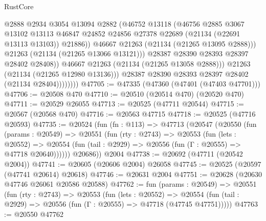 \begin{lexlean}{RustCore}
\begin{coremodule}
                              @2888
                              @2934
                              @3054
                              @13094
                              @2882
                              (@46752
                                @13118
                                (@46756
                                  @2885
                                  @3067
                                  @13102
                                  @13113
                                  @46847
                                  @24852
                                  @24856
                                  @27378
                                  @22689
                                  (@21134 (@22691 @13113 @13103))
                                  @21886))
                              @46667
                              @21263
                              (@21134 (@21265 @13095 @2888)))
                            @21263
                            (@21134 (@21265 @13066 @13121)))
                          @28387
                          @28390
                          @28393
                          @28397
                          @28402
                          @28408))
                      @46667
                      @21263
                      (@21134 (@21265 @13058 @2888)))
                    @21263
                    (@21134 (@21265 @12980 @13136)))
                  @28387
                  @28390
                  @28393
                  @28397
                  @28402
                  (@21134 @28404))))))))
@47705 := @47335 (@47360 (@47401 (@47403 @47701)))
@47706 := @20508 @470
@47710 := @20510 (@20514 @470) (@20520 @470)
@47711 := @20529 @26055
@47713 := @20525 (@47711 @20544)
@47715 := @20567 (@20568 @470)
@47716 := @20563 @47715
@47718 := @20525 (@47716 @20593)
@47735 := @20524
    (fun (fn : @113) =>
    @47713
      (@20547
        (@20550
          (fun (params : @20549) =>
          @20551
            (fun (rty : @2743) =>
            @20553
              (fun (lets : @20552) =>
              @20554 (fun (tail : @2929) => @20556 (fun (Γ : @20555) => @47718 @20640))))))
        @20686))
    @2004
@47738 := @20692 (@47711 (@20542 @2004))
@47741 := @20605 (@20606 @2004) @26058
@47745 := @20525 (@20597 (@47741 @20614) @20618)
@47746 := @20631 @2004
@47751 := @20628 (@20630 @47746 @26061 @20586 @20588)
@47762 := fun (params : @20549) =>
  @20551
    (fun (rty : @2743) =>
    @20553
      (fun (lets : @20552) =>
      @20554 (fun (tail : @2929) => @20556 (fun (Γ : @20555) => @47718 (@47745 @47751)))))
@47763 := @20550 @47762

\end{coremodule}
\end{lexlean}
